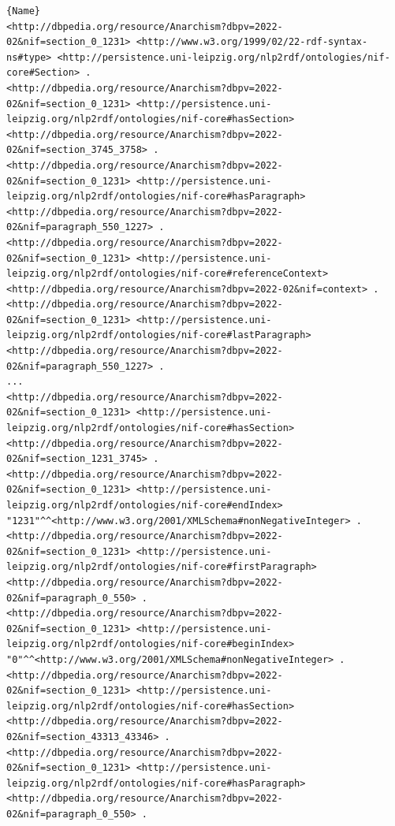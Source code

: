 \documentclass[thesis=M,english,hidelinks]{FITthesis}[2019/12/23]
\begin{document}
\begin{lstlisting}[caption=Example of an output for a Section,frame=tlrb,  label = {lst:nif-links}]{Name}
<http://dbpedia.org/resource/Anarchism?dbpv=2022-02&nif=section_0_1231> <http://www.w3.org/1999/02/22-rdf-syntax-ns#type> <http://persistence.uni-leipzig.org/nlp2rdf/ontologies/nif-core#Section> .
<http://dbpedia.org/resource/Anarchism?dbpv=2022-02&nif=section_0_1231> <http://persistence.uni-leipzig.org/nlp2rdf/ontologies/nif-core#hasSection> <http://dbpedia.org/resource/Anarchism?dbpv=2022-02&nif=section_3745_3758> .
<http://dbpedia.org/resource/Anarchism?dbpv=2022-02&nif=section_0_1231> <http://persistence.uni-leipzig.org/nlp2rdf/ontologies/nif-core#hasParagraph> <http://dbpedia.org/resource/Anarchism?dbpv=2022-02&nif=paragraph_550_1227> .
<http://dbpedia.org/resource/Anarchism?dbpv=2022-02&nif=section_0_1231> <http://persistence.uni-leipzig.org/nlp2rdf/ontologies/nif-core#referenceContext> <http://dbpedia.org/resource/Anarchism?dbpv=2022-02&nif=context> .
<http://dbpedia.org/resource/Anarchism?dbpv=2022-02&nif=section_0_1231> <http://persistence.uni-leipzig.org/nlp2rdf/ontologies/nif-core#lastParagraph> <http://dbpedia.org/resource/Anarchism?dbpv=2022-02&nif=paragraph_550_1227> .
...
<http://dbpedia.org/resource/Anarchism?dbpv=2022-02&nif=section_0_1231> <http://persistence.uni-leipzig.org/nlp2rdf/ontologies/nif-core#hasSection> <http://dbpedia.org/resource/Anarchism?dbpv=2022-02&nif=section_1231_3745> .
<http://dbpedia.org/resource/Anarchism?dbpv=2022-02&nif=section_0_1231> <http://persistence.uni-leipzig.org/nlp2rdf/ontologies/nif-core#endIndex> "1231"^^<http://www.w3.org/2001/XMLSchema#nonNegativeInteger> .
<http://dbpedia.org/resource/Anarchism?dbpv=2022-02&nif=section_0_1231> <http://persistence.uni-leipzig.org/nlp2rdf/ontologies/nif-core#firstParagraph> <http://dbpedia.org/resource/Anarchism?dbpv=2022-02&nif=paragraph_0_550> .
<http://dbpedia.org/resource/Anarchism?dbpv=2022-02&nif=section_0_1231> <http://persistence.uni-leipzig.org/nlp2rdf/ontologies/nif-core#beginIndex> "0"^^<http://www.w3.org/2001/XMLSchema#nonNegativeInteger> .
<http://dbpedia.org/resource/Anarchism?dbpv=2022-02&nif=section_0_1231> <http://persistence.uni-leipzig.org/nlp2rdf/ontologies/nif-core#hasSection> <http://dbpedia.org/resource/Anarchism?dbpv=2022-02&nif=section_43313_43346> .
<http://dbpedia.org/resource/Anarchism?dbpv=2022-02&nif=section_0_1231> <http://persistence.uni-leipzig.org/nlp2rdf/ontologies/nif-core#hasParagraph> <http://dbpedia.org/resource/Anarchism?dbpv=2022-02&nif=paragraph_0_550> .
\end{lstlisting}
\end{document}
